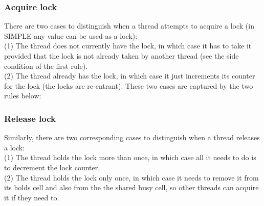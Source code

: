 \documentclass{article}
\begin{document}
\begin{kdefinition}
\begin{module}{}
\begin{kblock}[text]
 \subsubsection{Acquire lock}
There are two cases to distinguish when a thread attempts to acquire a lock
(in SIMPLE any value can be used as a lock):\\
(1) The thread does not currently have the lock, in which case it has to
take it provided that the lock is not already taken by another thread (see
the side condition of the first rule).\\
(2) The thread already has the lock, in which case it just increments its
counter for the lock (the locks are re-entrant).  These two cases are captured
by the two rules below: \end{kblock}
\begin{kblock}[text]
 \subsubsection{Release lock}
Similarly, there are two corresponding cases to distinguish when a thread
releases a lock:\\
(1) The thread holds the lock more than once, in which case all it needs to do
is to decrement the lock counter.\\
(2) The thread holds the lock only once, in which case it needs to remove it
from its \textsf{holds} cell and also from the the shared \textsf{busy} cell,
so other threads can acquire it if they need to. \end{kblock}
\begin{kblock}[text]

\end{kblock}
\end{module}
\end{kdefinition}
\end{document}
